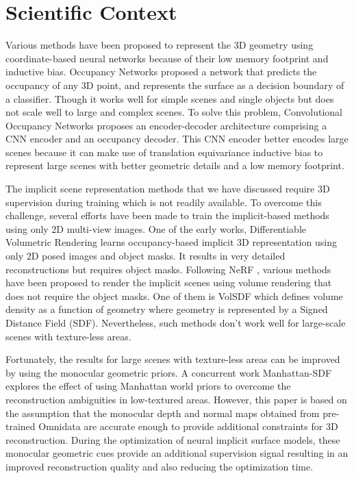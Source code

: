 \documentclass[a4paper]{paper}
\begin{document}
\section{Scientific Context} 
Various methods have been proposed to represent the 3D geometry using coordinate-based neural networks because of their low memory footprint and inductive bias. Occupancy Networks \cite{Occupancy_Networks} proposed a network that predicts the occupancy of any 3D point, and represents the surface as a decision boundary of a classifier. Though it works well for simple scenes and single objects but does not scale well to large and complex scenes. To solve this problem, Convolutional Occupancy Networks \cite{Peng2020ECCV} proposes an encoder-decoder architecture comprising a CNN encoder and an occupancy decoder. This CNN encoder better encodes large scenes because it can make use of translation equivariance inductive bias to represent large scenes with better geometric details and a low memory footprint. \newline

The implicit scene representation methods that we have discussed require 3D supervision during training which is not readily available. To overcome this challenge, several efforts have been made to train the implicit-based methods using only 2D multi-view images. One of the early works, Differentiable Volumetric Rendering \cite{Niemeyer2020CVPR} learns occupancy-based implicit 3D representation using only 2D posed images and object masks. It results in very detailed reconstructions but requires object masks. Following NeRF \cite{mildenhall2020nerf}, various methods have been proposed to render the implicit scenes using volume rendering that does not require the object masks. One of them is VolSDF \cite{yariv2021volume} which defines volume density as a function of geometry where geometry is represented by a Signed Distance Field (SDF). Nevertheless, such methods don't work well for large-scale scenes with texture-less areas. \newline

Fortunately, the results for large scenes with texture-less areas can be improved by using the monocular geometric priors. A concurrent work Manhattan-SDF \cite{guo2022manhattan} explores the effect of using Manhattan world priors to overcome the reconstruction ambiguities in low-textured areas. However, this paper is based on the assumption that the monocular depth and normal maps obtained from pre-trained Omnidata \cite{eftekhar2021omnidata} are accurate enough to provide additional constraints for 3D reconstruction. During the optimization of neural implicit surface models, these monocular geometric cues provide an additional supervision signal resulting in an improved reconstruction quality and also reducing the optimization time. \newline
\end{document}
